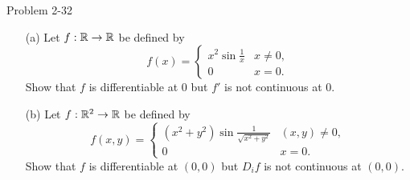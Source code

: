 \documentclass{hmwk}
\begin{document}
\begin{problem}{Problem 2-32}
\begin{itemize}
    \item[(a)] Let $f: \mathbb{R} \rightarrow \mathbb{R}$ be defined by 
    $$f(x) = \begin{cases}
        x^2\sin\frac{1}{x} & x \neq 0, \\
        0 & x = 0.
    \end{cases}$$
    Show that $f$ is differentiable at $0$ but $f'$ is not continuous at 0.
    \item[(b)] Let $f: \mathbb{R}^2 \rightarrow \mathbb{R}$ be defined by 
    $$f(x, y) = \begin{cases}
        (x^2 + y^2)\sin\frac{1}{\sqrt{x^2 + y^2}} & (x, y) \neq 0, \\
        0 & x = 0.
    \end{cases}$$
    Show that $f$ is differentiable at $(0, 0)$ but $D_if$ is not continuous at $(0, 0)$.
\end{itemize}
\end{problem}
\end{document}
